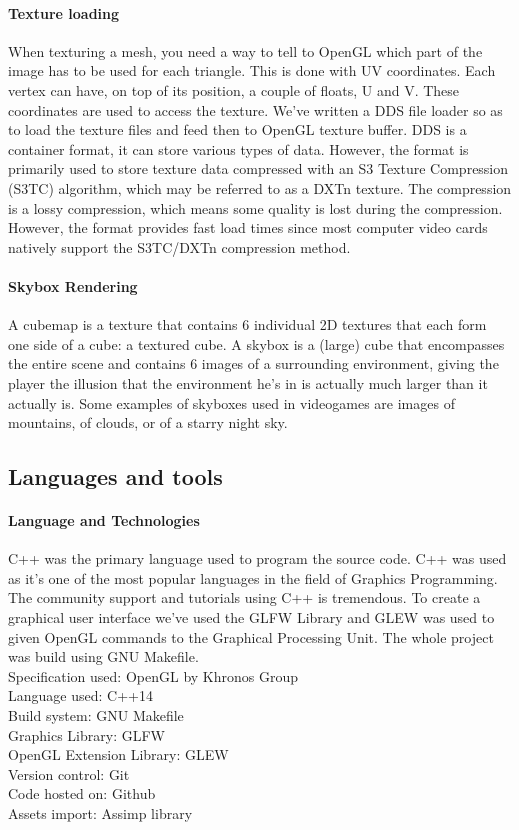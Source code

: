 \documentclass{report}
\begin{document}
    \paragraph{Texture loading}
    When texturing a mesh, you need a way to tell to OpenGL which part of the image has to be used for 
    each triangle. This is done with UV coordinates.
    Each vertex can have, on top of its position, a couple of floats, U and V. These coordinates are 
    used to access the texture. We've written a DDS file loader so as to load the texture files and feed 
    then to OpenGL texture buffer.
     DDS is a container format, it can store various types of data. However, the format is primarily used 
    to store texture data compressed with an S3 Texture Compression (S3TC) algorithm, which may be referred 
    to as a DXTn texture.  \cite{WEBSITE:1}
    The compression is a lossy compression, which means some quality is lost during the compression. 
    However, the format provides fast load times since most computer video cards natively support 
    the S3TC/DXTn compression method.

    \paragraph{Skybox Rendering}
    A cubemap is a texture that contains 6 individual 2D textures that each form one side of a cube: 
    a textured cube.\cite{WEBSITE:2} A skybox is a (large) cube that encompasses the entire scene and contains 6 images 
    of a surrounding environment, giving the player the illusion that the environment he's in is actually 
    much larger than it actually is. Some examples of skyboxes used in videogames are images of mountains, 
    of clouds, or of a starry night sky.
\subsection{Languages and tools}
    \paragraph{Language and Technologies}
    C++ was the primary language used to program the source code. C++ was used as it's one of the most popular 
    languages in the field of Graphics Programming. The community support and tutorials using C++ is tremendous. 
    To create a graphical user interface we've used the GLFW Library and GLEW was used to given OpenGL commands 
    to the Graphical Processing Unit. The whole project was build using GNU Makefile. 
    \\Specification used: OpenGL by Khronos Group
    \\Language used: C++14
    \\Build system: GNU Makefile 
    \\Graphics Library: GLFW 
    \\OpenGL Extension Library: GLEW 
    \\Version control: Git 
    \\Code hosted on: Github
    \\Assets import: Assimp library
\end{document}
